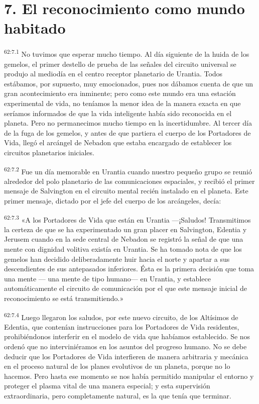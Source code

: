 \section*{7. El reconocimiento como mundo habitado}
\par
\textsuperscript{62:7.1} No tuvimos que esperar mucho tiempo. Al día siguiente de la huida de los gemelos, el primer destello de prueba de las señales del circuito universal se produjo al mediodía en el centro receptor planetario de Urantia. Todos estábamos, por supuesto, muy emocionados, pues nos dábamos cuenta de que un gran acontecimiento era inminente; pero como este mundo era una estación experimental de vida, no teníamos la menor idea de la manera exacta en que seríamos informados de que la vida inteligente había sido reconocida en el planeta. Pero no permanecimos mucho tiempo en la incertidumbre. Al tercer día de la fuga de los gemelos, y antes de que partiera el cuerpo de los Portadores de Vida, llegó el arcángel de Nebadon que estaba encargado de establecer los circuitos planetarios iniciales.

\par
\textsuperscript{62:7.2} Fue un día memorable en Urantia cuando nuestro pequeño grupo se reunió alrededor del polo planetario de las comunicaciones espaciales, y recibió el primer mensaje de Salvington en el circuito mental recién instalado en el planeta. Este primer mensaje, dictado por el jefe del cuerpo de los arcángeles, decía:

\par
\textsuperscript{62:7.3} «A los Portadores de Vida que están en Urantia ---¡Saludos! Transmitimos la certeza de que se ha experimentado un gran placer en Salvington, Edentia y Jerusem cuando en la sede central de Nebadon se registró la señal de que una mente con dignidad volitiva existía en Urantia. Se ha tomado nota de que los gemelos han decidido deliberadamente huir hacia el norte y apartar a sus descendientes de sus antepasados inferiores. Ésta es la primera decisión que toma una mente --- una mente de tipo humano--- en Urantia, y establece automáticamente el circuito de comunicación por el que este mensaje inicial de reconocimiento se está transmitiendo.»

\par
\textsuperscript{62:7.4} Luego llegaron los saludos, por este nuevo circuito, de los Altísimos de Edentia, que contenían instrucciones para los Portadores de Vida residentes, prohibiéndonos interferir en el modelo de vida que habíamos establecido. Se nos ordenó que no interviniéramos en los asuntos del progreso humano. No se debe deducir que los Portadores de Vida interfieren de manera arbitraria y mecánica en el proceso natural de los planes evolutivos de un planeta, porque no lo hacemos. Pero hasta ese momento se nos había permitido manipular el entorno y proteger el plasma vital de una manera especial; y esta supervisión extraordinaria, pero completamente natural, es la que tenía que terminar.

